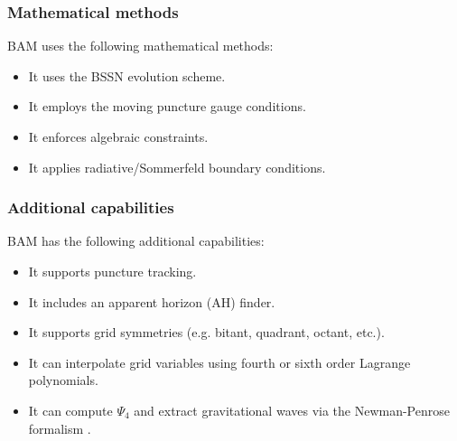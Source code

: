 \documentclass[12pt,a4paper]{article}
\numberwithin{figure}{subsection}
\newcommand{\bam}{\textsc{BAM}\xspace}
\begin{document}
\subsubsection{Mathematical methods}
\bam uses the following mathematical methods:
\begin{itemize}
    \item It uses the BSSN evolution scheme.
    \item It employs the moving puncture gauge conditions.
    \item It enforces algebraic constraints.
    \item It applies radiative/Sommerfeld boundary conditions.
\end{itemize}

\subsubsection{Additional capabilities}
\bam has the following additional capabilities:
\begin{itemize}
    \item It supports puncture tracking.
    \item It includes an apparent horizon (AH) finder.
    \item It supports grid symmetries (e.g. bitant, quadrant, octant, etc.).
    \item It can interpolate grid variables using fourth or sixth order Lagrange
    polynomials.
    \item It can compute $\Psi_4$ and extract gravitational waves via the
    Newman-Penrose formalism \cite{Newman:1961qr}.
\end{itemize}
\end{document}
